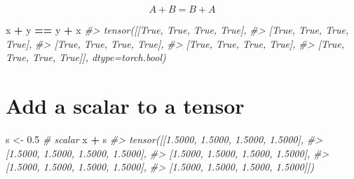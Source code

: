 \documentclass[]{book}
\newenvironment{Shaded}{\begin{snugshade}}{\end{snugshade}}
\newcommand{\CommentTok}[1]{\textcolor[rgb]{0.56,0.35,0.01}{\textit{#1}}}
\newcommand{\DataTypeTok}[1]{\textcolor[rgb]{0.13,0.29,0.53}{#1}}
\newcommand{\FloatTok}[1]{\textcolor[rgb]{0.00,0.00,0.81}{#1}}
\newcommand{\KeywordTok}[1]{\textcolor[rgb]{0.13,0.29,0.53}{\textbf{#1}}}
\newcommand{\NormalTok}[1]{#1}
\newcommand{\OperatorTok}[1]{\textcolor[rgb]{0.81,0.36,0.00}{\textbf{#1}}}
\newcommand{\StringTok}[1]{\textcolor[rgb]{0.31,0.60,0.02}{#1}}
\begin{document}
\begin{Shaded}
\end{Shaded}

\[A + B = B + A\]

\begin{Shaded}
\begin{Highlighting}[]
\NormalTok{x }\OperatorTok{+}\StringTok{ }\NormalTok{y }\OperatorTok{==}\StringTok{ }\NormalTok{y }\OperatorTok{+}\StringTok{ }\NormalTok{x}
\CommentTok{#> tensor([[True, True, True, True],}
\CommentTok{#>         [True, True, True, True],}
\CommentTok{#>         [True, True, True, True],}
\CommentTok{#>         [True, True, True, True],}
\CommentTok{#>         [True, True, True, True]], dtype=torch.bool)}
\end{Highlighting}
\end{Shaded}

\hypertarget{add-a-scalar-to-a-tensor}{%
\section{Add a scalar to a tensor}\label{add-a-scalar-to-a-tensor}}

\begin{Shaded}
\begin{Highlighting}[]
\NormalTok{s <-}\StringTok{ }\FloatTok{0.5}    \CommentTok{# scalar}
\NormalTok{x }\OperatorTok{+}\StringTok{ }\NormalTok{s}
\CommentTok{#> tensor([[1.5000, 1.5000, 1.5000, 1.5000],}
\CommentTok{#>         [1.5000, 1.5000, 1.5000, 1.5000],}
\CommentTok{#>         [1.5000, 1.5000, 1.5000, 1.5000],}
\CommentTok{#>         [1.5000, 1.5000, 1.5000, 1.5000],}
\CommentTok{#>         [1.5000, 1.5000, 1.5000, 1.5000]])}
\end{Highlighting}
\end{Shaded}
\end{document}
